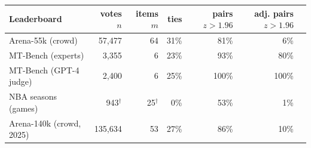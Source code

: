 \begin{tabular}{lrrrrrr}\toprule
Leaderboard & votes $n$ & items $m$ & ties & pairs $z{>}1.96$ & adj. pairs $z{>}1.96$ \\\midrule
Arena-55k (crowd) & 57{,}477 & 64 & 31\% & 81\% & 6\% \\
MT-Bench (experts) & 3{,}355 & 6 & 23\% & 93\% & 80\% \\
MT-Bench (GPT-4 judge) & 2{,}400 & 6 & 25\% & 100\% & 100\% \\
NBA seasons (games) & 943$^\dagger$ & 25$^\dagger$ & 0\% & 53\% & 1\% \\
Arena-140k (crowd, 2025) & 135{,}634 & 53 & 27\% & 86\% & 10\% \\
\bottomrule\end{tabular}
